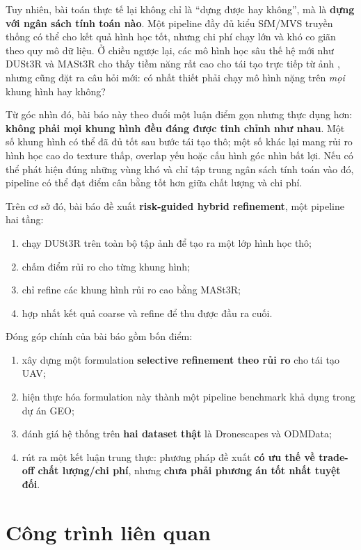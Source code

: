 \documentclass[11pt,a4paper]{article}
\begin{document}
Tuy nhiên, bài toán thực tế lại không chỉ là ``dựng được hay không'', mà là \textbf{dựng với ngân sách tính toán nào}. Một pipeline đầy đủ kiểu SfM/MVS truyền thống có thể cho kết quả hình học tốt, nhưng chi phí chạy lớn và khó co giãn theo quy mô dữ liệu. Ở chiều ngược lại, các mô hình học sâu thế hệ mới như DUSt3R và MASt3R cho thấy tiềm năng rất cao cho tái tạo trực tiếp từ ảnh \citep{Wang2024DUSt3R,Leroy2024MASt3R,Wu2025AerialBlocks}, nhưng cũng đặt ra câu hỏi mới: có nhất thiết phải chạy mô hình nặng trên \textit{mọi} khung hình hay không?

Từ góc nhìn đó, bài báo này theo đuổi một luận điểm gọn nhưng thực dụng hơn: \textbf{không phải mọi khung hình đều đáng được tinh chỉnh như nhau}. Một số khung hình có thể đã đủ tốt sau bước tái tạo thô; một số khác lại mang rủi ro hình học cao do texture thấp, overlap yếu hoặc cấu hình góc nhìn bất lợi. Nếu có thể phát hiện đúng những vùng khó và chỉ tập trung ngân sách tính toán vào đó, pipeline có thể đạt điểm cân bằng tốt hơn giữa chất lượng và chi phí.

Trên cơ sở đó, bài báo đề xuất \textbf{risk-guided hybrid refinement}, một pipeline hai tầng:
\begin{enumerate}[leftmargin=1.5em]
  \item chạy DUSt3R trên toàn bộ tập ảnh để tạo ra một lớp hình học thô;
  \item chấm điểm rủi ro cho từng khung hình;
  \item chỉ refine các khung hình rủi ro cao bằng MASt3R;
  \item hợp nhất kết quả coarse và refine để thu được đầu ra cuối.
\end{enumerate}

Đóng góp chính của bài báo gồm bốn điểm:
\begin{enumerate}[leftmargin=1.5em]
  \item xây dựng một formulation \textbf{selective refinement theo rủi ro} cho tái tạo UAV;
  \item hiện thực hóa formulation này thành một pipeline benchmark khả dụng trong dự án GEO;
  \item đánh giá hệ thống trên \textbf{hai dataset thật} là Dronescapes và ODMData;
  \item rút ra một kết luận trung thực: phương pháp đề xuất \textbf{có ưu thế về trade-off chất lượng/chi phí}, nhưng \textbf{chưa phải phương án tốt nhất tuyệt đối}.
\end{enumerate}

\section{Công trình liên quan}
\end{document}

